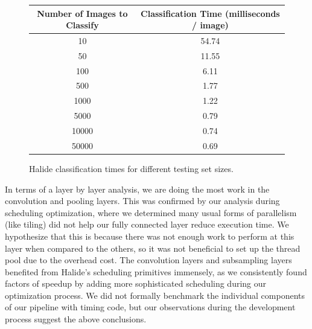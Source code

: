\documentclass[11pt,twoside]{article}
\begin{document}
\begin{figure}
\centering
\begin{tabular}{| c | c |} \hline
Number of Images to Classify & Classification Time (milliseconds / image) \\ \hline
10 & 54.74 \\ \hline
50 & 11.55 \\ \hline
100 & 6.11 \\ \hline
500 & 1.77 \\ \hline
1000 & 1.22 \\ \hline
5000 & 0.79 \\ \hline
10000 & 0.74 \\ \hline
50000 & 0.69 \\ \hline
\end{tabular}
\caption{Halide classification times for different testing set sizes.}
\end{figure}

In terms of a layer by layer analysis, we are doing the most work in the convolution and pooling layers. 
This was confirmed by our analysis during scheduling optimization, where we determined many usual forms of parallelism (like tiling) did not help our fully connected layer reduce execution time.  
We hypothesize that this is because there was not enough work to perform at this layer when compared to the others, so it was not beneficial to set up the thread pool due to the overhead cost.  
The convolution layers and subsampling layers benefited from Halide's scheduling primitives immensely, as we consistently found factors of speedup by adding more sophisticated scheduling during our optimization process.  
We did not formally benchmark the individual components of our pipeline with timing code, but our observations during the development process suggest the above conclusions.
\end{document}
